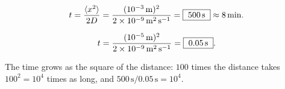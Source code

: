 \solution

\begin{equation}
  t=\frac{\langle x^2 \rangle}{2D}=\frac{(10^{-3}\,\mathrm m)^2}{2\times10^{-9}\,\mathrm{m^2\,s^{-1}}}
  =\boxed{\;500\,\mathrm s\;}\approx 8\,\mathrm{min}.
\end{equation}

\begin{equation}
  t=\frac{(10^{-5}\,\mathrm m)^2}{2\times10^{-9}\,\mathrm{m^2\,s^{-1}}}
  =\boxed{\;0.05\,\mathrm s\;}.
\end{equation}

The time grows as the square of the distance: $100$ times the distance takes
$100^2=10^4$ times as long, and $500\,\mathrm s/0.05\,\mathrm s=10^4$.
